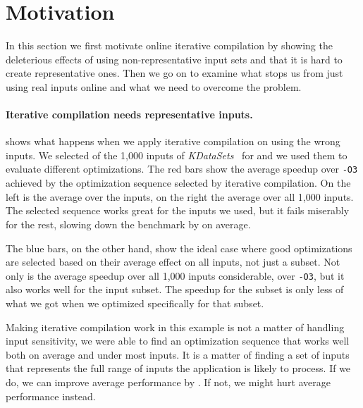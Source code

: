 \section{Motivation \label{sec:motivation}}


    In this section we first motivate online iterative compilation by showing the deleterious effects of using non-representative input
    sets and that it is hard to create representative ones. Then we go on to examine what stops us from just using real inputs online and
    what we need to overcome the problem.

    \paragraph{Iterative compilation needs representative inputs.}  shows what happens when we apply iterative compilation
    on  using the wrong inputs. We selected  of the 1,000 inputs of \textit{KDataSets}~\cite{chen10,chen12a} for
     and we used them to evaluate different optimizations. The red bars show the average speedup over \texttt{-O3} achieved
    by the optimization sequence selected by iterative compilation. On the left is the average over the  inputs, on the right the
    average over all 1,000 inputs. The selected sequence works great for the inputs we used, but it fails miserably for the rest, slowing
    down the benchmark by  on average. 

    The blue bars, on the other hand, show the ideal case where good optimizations are selected based on their average effect on all
    inputs, not just a subset. Not only is the average speedup over all 1,000 inputs considerable,  over \texttt{-O3}, but it
    also works well for the  input subset. The speedup for the subset is only  less of what we got when we optimized
    specifically for that subset.

    Making iterative compilation work in this example is not a matter of handling input sensitivity, we were able to find an optimization
    sequence that works well both on average and under most inputs. It is a matter of finding a set of inputs that represents the full
    range of inputs the application is likely to process. If we do, we can improve average performance by . If not, we might
    hurt average performance instead. 
    
